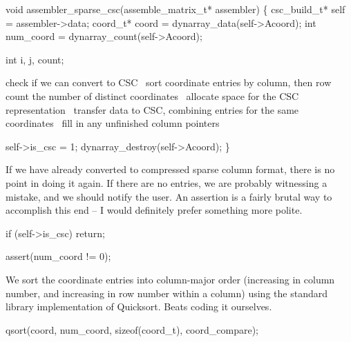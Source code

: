 \nwenddocs{}\plusendmoddef
void assembler_sparse_csc(assemble_matrix_t* assembler)
\{
    csc_build_t* self       = assembler->data;
    coord_t*     coord      = dynarray_data(self->Acoord);
    int          num_coord  = dynarray_count(self->Acoord);

    int i, j, count;

    \LA{}check if we can convert to CSC~{\nwtagstyle{}}\RA{}
    \LA{}sort coordinate entries by column, then row~{\nwtagstyle{}}\RA{}
    \LA{}count the number of distinct coordinates~{\nwtagstyle{}}\RA{}
    \LA{}allocate space for the CSC representation~{\nwtagstyle{}}\RA{}
    \LA{}transfer data to CSC, combining entries for the same coordinates~{\nwtagstyle{}}\RA{}
    \LA{}fill in any unfinished column pointers~{\nwtagstyle{}}\RA{}

    self->is_csc = 1;
    dynarray_destroy(self->Acoord);
\}

\nwendcode{}\nwdocspar

If we have already converted to compressed sparse column format, there
is no point in doing it again.  If there are no entries, we are probably
witnessing a mistake, and we should notify the user.  An assertion is
a fairly brutal way to accomplish this end -- I would definitely prefer
something more polite.

\nwenddocs{}\endmoddef
if (self->is_csc) 
    return;

assert(num_coord != 0);

\nwendcode{}\nwdocspar

We sort the coordinate entries into column-major order (increasing
in column number, and increasing in row number within a column)
using the standard library implementation of Quicksort.  Beats coding
it ourselves.

\nwenddocs{}\endmoddef
qsort(coord, num_coord, sizeof(coord_t), coord_compare);

